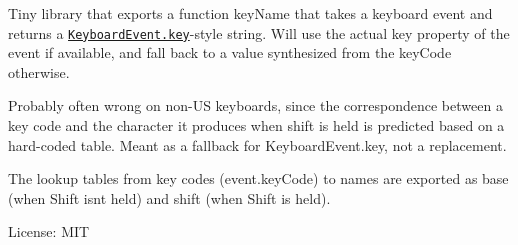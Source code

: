 Tiny library that exports a function {\ttfamily key\+Name} that takes a keyboard event and returns a \href{https://developer.mozilla.org/en-US/docs/Web/API/KeyboardEvent/key}{\texttt{ {\ttfamily Keyboard\+Event.\+key}}}-\/style string. Will use the actual {\ttfamily key} property of the event if available, and fall back to a value synthesized from the {\ttfamily key\+Code} otherwise.

Probably often wrong on non-\/\+US keyboards, since the correspondence between a key code and the character it produces when shift is held is predicted based on a hard-\/coded table. Meant as a fallback for {\ttfamily Keyboard\+Event.\+key}, not a replacement.

The lookup tables from key codes ({\ttfamily event.\+key\+Code}) to names are exported as {\ttfamily base} (when Shift isn\textquotesingle{}t held) and {\ttfamily shift} (when Shift is held).

License\+: M\+IT 